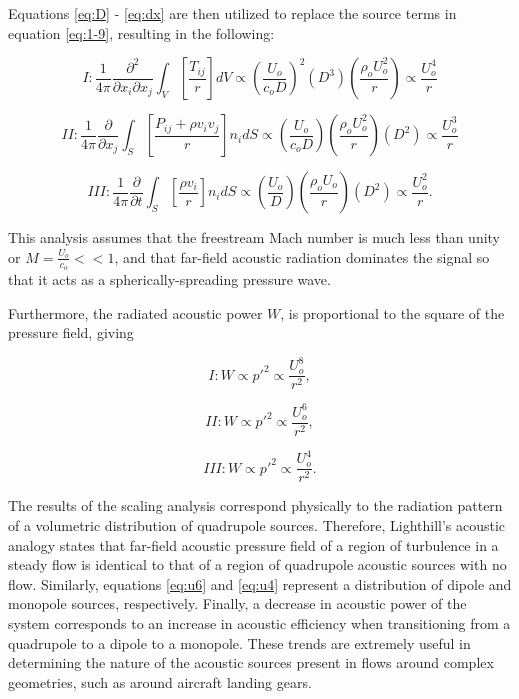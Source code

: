 Equations \ref{eq:D} - \ref{eq:dx} are then utilized to replace the source terms in equation \ref{eq:1-9}, resulting in the following:

\begin{equation}
I : \frac{1}{4\pi} \frac{\partial^2}{\partial x_i \partial x_j} \int_V \left[ \frac{T_{ij}}{r} \right] dV \propto \left( \frac{U_o}{c_o D} \right)^2 \left( D^3 \right) \left( \frac{\rho_o U_o^2}{r} \right) \propto \frac{U_o^4}{r}
\end{equation}

\begin{equation}
II : \frac{1}{4\pi} \frac{\partial}{\partial x_j} \int_S \left[ \frac{P_{ij} + \rho v_i v_j}{r} \right] n_i dS \propto \left( \frac{U_o}{c_oD} \right) \left( \frac{\rho_o U_o^2}{r} \right) \left( D^2 \right) \propto \frac{U_o^3}{r}
\end{equation}

\begin{equation}
III : \frac{1}{4\pi} \frac{\partial}{\partial t} \int_S \left[ \frac{\rho v_i}{r} \right] n_i dS \propto \left( \frac{U_o}{D} \right) \left( \frac{\rho_o U_o}{r} \right) \left( D^2 \right) \propto \frac{U_o^2}{r}.
\end{equation}

This analysis assumes that the freestream Mach number is much less than unity or $M = \frac{U_o}{c_o} << 1$, and that far-field acoustic radiation dominates the signal so that it acts as a spherically-spreading pressure wave. 

Furthermore, the radiated acoustic power $W$, is proportional to the square of the pressure field, giving

\begin{equation} \label{eq:u8}
I : W \propto p'^2 \propto \frac{U_o^8}{r^2},
\end{equation}

\begin{equation} \label{eq:u6}
II : W \propto p'^2 \propto \frac{U_o^6}{r^2},
\end{equation}

\begin{equation} \label{eq:u4}
III : W \propto p'^2 \propto \frac{U_o^4}{r^2}.
\end{equation}

The results of the scaling analysis correspond physically to the radiation pattern of a volumetric distribution of quadrupole sources. Therefore, Lighthill's acoustic analogy states that far-field acoustic pressure field of a region of turbulence in a steady flow is identical to that of a region of quadrupole acoustic sources with no flow. Similarly, equations \ref{eq:u6} and \ref{eq:u4} represent a distribution of dipole and monopole sources, respectively. Finally, a decrease in acoustic power of the system corresponds to an increase in acoustic efficiency when transitioning from a quadrupole to a dipole to a monopole. These trends are extremely useful in determining the nature of the acoustic sources present in flows around complex geometries, such as around aircraft landing gears.

